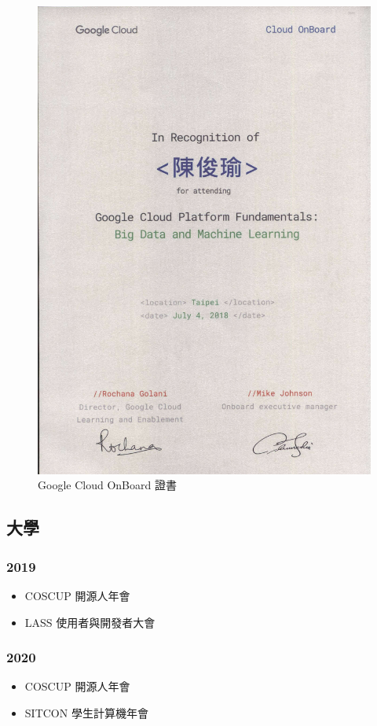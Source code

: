 \documentclass[classical]{einfart}
\providecommand{\tightlist}{%
  \setlength{\itemsep}{0pt}\setlength{\parskip}{0pt}}
\begin{document}
\begin{figure}[H]
    \centering
    \includegraphics[height=0.6\textwidth]{images/Google Cloud OnBoard.jpg}
    \caption{Google Cloud OnBoard 證書}
\end{figure}

\subsection{大學}

\subsubsection*{2019}

\begin{itemize}
\tightlist
\item
  COSCUP 開源人年會
\item
  LASS 使用者與開發者大會
\end{itemize}

\subsubsection*{2020}

\begin{itemize}
\tightlist
\item
  COSCUP 開源人年會
\item
  SITCON 學生計算機年會
\end{itemize}
\end{document}
